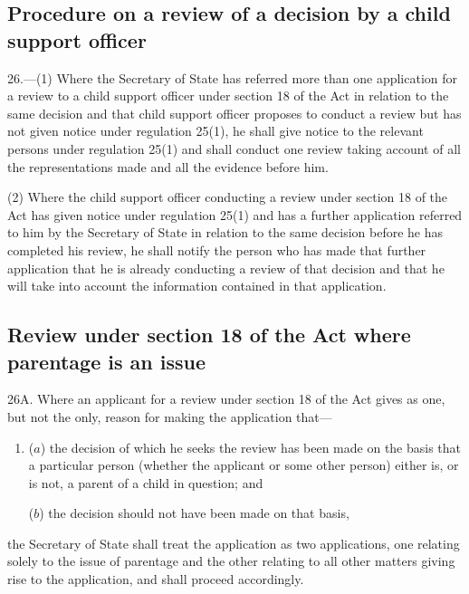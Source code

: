 \documentclass[a4paper]{article}
\begin{document}
\subsection[26. Procedure on a review of a decision by a child support officer]{Procedure on a review of a decision by a child support officer}

26.—(1) Where the Secretary of State has referred more than one application for a review to a child support officer under section 18 of the Act in relation to the same decision and that child support officer proposes to conduct a review but has not given notice under regulation 25(1), he shall give notice to the relevant persons under regulation 25(1) and shall conduct one review taking account of all the representations made and all the evidence before him.

(2) Where the child support officer conducting a review under section 18 of the Act has given notice under regulation 25(1) and has a further application referred to him by the Secretary of State in relation to the same decision before he has completed his review, he shall notify the person who has made that further application that he is already conducting a review of that decision and that he will take into account the information contained in that application.

\subsection[26A. Review under section 18 of the Act where parentage is an issue]{Review under section 18 of the Act where parentage is an issue}

26A.  Where an applicant for a review under section 18 of the Act gives as one, but not the only, reason for making the application that---
\begin{enumerate}\item[]
($a$) the decision of which he seeks the review has been made on the basis that a particular person (whether the applicant or some other person) either is, or is not, a parent of a child in question; and

($b$) the decision should not have been made on that basis,
\end{enumerate}
the Secretary of State shall treat the application as two applications, one relating solely to the issue of parentage and the other relating to all other matters giving rise to the application, and shall proceed accordingly.
\end{document}
